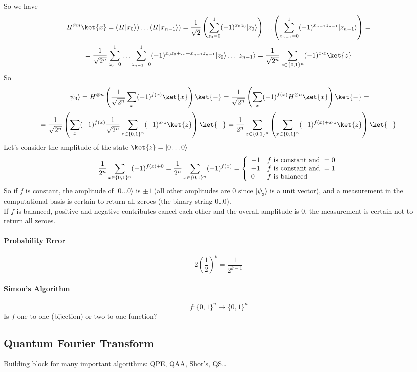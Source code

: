 \documentclass[10pt]{report}
\begin{document}
So we have
$$H^{\otimes n}\ket{x} = (H|x_0\rangle)\ldots(H|x_{n-1}\rangle) = \frac{1}{\sqrt{2}}\left(\sum_{z_0=0}^1(-1)^{x_0z_0}|z_0\rangle\right)\ldots\left(\sum_{z_{n-1}=0}^1(-1)^{x_{n-1}z_{n-1}}|z_{n-1}\rangle\right)=$$
$$=\frac{1}{\sqrt{2^n}} \sum_{z_0=0}^1\ldots\sum_{z_{n-1}=0}^1 (-1)^{x_0z_0+\ldots+x_{n-1}z_{n-1}}|z_0\rangle\ldots|z_{n-1}\rangle = \frac{1}{\sqrt{2^n}}\sum_{z\in\{0,1\}^n} (-1)^{x\cdot z}\ket{z}$$
So
$$|\psi_3\rangle = H^{\otimes n}\left(\frac{1}{\sqrt{2^n}}\sum_x(-1)^{f(x)}\ket{x} \right)\ket{-} = \frac{1}{\sqrt{2^n}}\left(\sum_x (-1)^{f(x)}H^{\otimes n}\ket{x}\right)\ket{-} =$$ $$= \frac{1}{\sqrt{2^n}}\left( \sum_x (-1)^{f(x)}\frac{1}{\sqrt{2^n}}\sum_{z\in\{0,1\}^n}(-1)^{x\cdot z}\ket{z}\right)\ket{-} = \frac{1}{2^n}\sum_{z\in\{0,1\}^n}\left(\sum_{x\in\{0,1\}^n}(-1)^{f(x)+x\cdot z}\ket{z}\right)\ket{-}$$
Let's consider the amplitude of the state $\ket{z} = |0\ldots 0\rangle$
$$\frac{1}{2^n}\sum_{x\in\{0,1\}^n}(-1)^{f(x)+0} = \frac{1}{2^n}\sum_{x\in\{0,1\}^n}(-1)^{f(x)}=\left\{\begin{array}{l l}
-1&f\hbox{ is constant and }=0\\
+1&f\hbox{ is constant and }=1\\
0&f\hbox{ is balanced}\\
\end{array}\right.$$
So if $f$ is constant, the amplitude of $|0\ldots0\rangle$ is $\pm 1$ (all other amplitudes are 0 since $|\psi_3\rangle$ is a unit vector), and a measurement in the computational basis is certain to return all zeroes (the binary string 0\ldots 0).\\
If $f$ is balanced, positive and negative contributes cancel each other and the overall amplitude is 0, the measurement is certain not to return all zeroes.
\paragraph{Probability Error} $$2\left(\frac{1}{2}\right)^k = \frac{1}{2^{k-1}}$$
\paragraph{Simon's Algorithm} $$f:\{0,1\}^n\rightarrow\{0,1\}^n$$
Is $f$ one-to-one (bijection) or two-to-one function?
\pagebreak
\subsection{Quantum Fourier Transform}
Building block for many important algorithms: QPE, QAA, Shor's, QS\ldots
\end{document}
